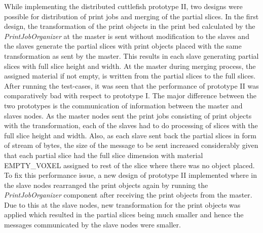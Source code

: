 While implementing the distributed cuttlefish prototype II, two designs were possible for distribution of print jobs and merging of the partial slices. In the first design, the transformation of the print objects in the print bed calculated by the \textit{PrintJobOrganizer} at the master is sent without modification to the slaves and the slaves generate the partial slices with print objects placed with the same transformation as sent by the master. This results in each slave generating partial slices with full slice height and width. At the master during merging process, the assigned material if not empty, is written from the partial slices to the full slices. After running the test-cases, it was seen that the performance of prototype II was comparatively bad with respect to prototype I. The major difference between the two prototypes is the communication of information between the master and slaves nodes. As the master nodes sent the print jobs consisting of print objects with the transformation, each of the slaves had to do processing of slices with the full slice height and width. Also, as each slave sent back the partial slices in form of stream of bytes, the size of the message to be sent increased considerably given that each partial slice had the full slice dimension with material EMPTY\_VOXEL assigned to rest of the slice where there was no object placed.  To fix this performance issue, a new design of prototype II implemented where in the slave nodes rearranged the print objects again by running the \textit{PrintJobOrganizer} component after receiving the print objects from the master. Due to this at the slave nodes, new transformation for the print objects was applied which resulted in the partial slices being much smaller and hence the messages communicated by the slave nodes were smaller. \newline

